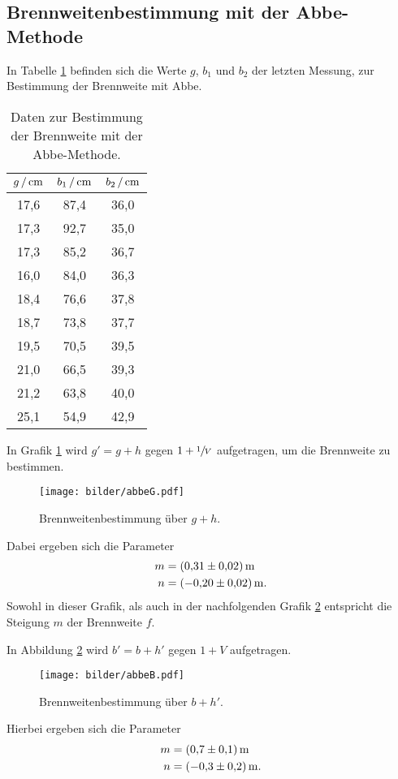 \subsection{Brennweitenbestimmung mit der Abbe-Methode}
In Tabelle \ref{tab:abbe} befinden sich die Werte $g$, $b_1$ und $b_2$ der letzten
Messung, zur Bestimmung der Brennweite mit Abbe.
\begin{table}[H]
  \centering
  \caption{Daten zur Bestimmung der Brennweite mit der Abbe-Methode.}
  \label{tab:abbe}
  \begin{tabular}{ccc}
    \toprule
    $g\,/\,\si{\centi\meter}$ & $b_1\,/\,\si{\centi\meter}$ & $b_2\,/\,\si{\centi\meter}$ \\
    \midrule
    17,6 & 87,4 & 36,0 \\
    17,3 & 92,7 & 35,0 \\
    17,3 & 85,2 & 36,7 \\
    16,0 & 84,0 & 36,3 \\
    18,4 & 76,6 & 37,8 \\
    18,7 & 73,8 & 37,7 \\
    19,5 & 70,5 & 39,5 \\
    21,0 & 66,5 & 39,3 \\
    21,2 & 63,8 & 40,0 \\
    25,1 & 54,9 & 42,9 \\
    \bottomrule
  \end{tabular}
\end{table}
In Grafik \ref{fig:abbeG} wird $g' = g + h$ gegen $1+ \sfrac{1}{V}$ aufgetragen,
um die Brennweite zu bestimmen.
\begin{figure}[H]
  \centering
  \texttt{[image: bilder/abbeG.pdf]}
  \caption{Brennweitenbestimmung über $g+h$.}
  \label{fig:abbeG}
\end{figure}
Dabei ergeben sich die Parameter
\begin{align}
  m &= \SI{0,31\pm0,02}{\meter} \\
  n &= \SI{-0,20\pm0,02}{\meter}.
\end{align}
Sowohl in dieser Grafik, als auch in der nachfolgenden Grafik \ref{fig:abbeB}
entspricht die Steigung $m$ der Brennweite $f$.

In Abbildung \ref{fig:abbeB} wird $b' = b+h'$ gegen $1+V$ aufgetragen.
\begin{figure}[H]
  \centering
  \texttt{[image: bilder/abbeB.pdf]}
  \caption{Brennweitenbestimmung über $b+h'$.}
  \label{fig:abbeB}
\end{figure}
Hierbei ergeben sich die Parameter
\begin{align}
  m &= \SI{0,7\pm0,1}{\meter} \\
  n &= \SI{-0,3\pm0,2}{\meter}.
\end{align}
